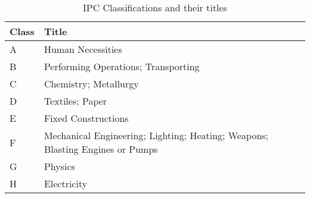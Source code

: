 \begin{table}[H]
	\centering
	\begin{tabular}{ | l | l |}
		\hline
		\textbf{Class} & \textbf{Title} \\
				\hline
		A & Human Necessities \\
				\hline
		B & Performing Operations; Transporting \\
				\hline
		C & Chemistry; Metallurgy \\
				\hline
		D & Textiles; Paper \\
				\hline
		E & Fixed Constructions \\
				\hline
		F & Mechanical Engineering; Lighting; Heating; Weapons; Blasting Engines or Pumps \\
		\hline
		G & Physics \\
				\hline
		H & Electricity \\
				\hline
	\end{tabular}
	\caption{IPC Classifications and their titles}
\end{table}







